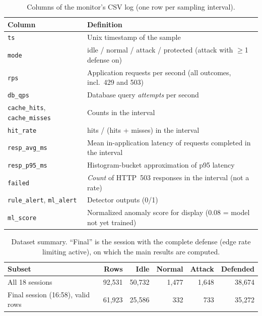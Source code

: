 \documentclass[preprint,12pt]{elsarticle}
\begin{document}
\begin{table}[t]
\centering
\caption{Columns of the monitor's CSV log (one row per sampling interval).}
\label{tab:csv}
\small
\begin{tabularx}{\linewidth}{@{}L{2.6cm}Y@{}}
\toprule
Column & Definition \\
\midrule
\texttt{ts} & Unix timestamp of the sample \\
\texttt{mode} & idle / normal / attack / protected (attack with $\ge$1 defense on) \\
\texttt{rps} & Application requests per second (all outcomes, incl.\ 429 and 503) \\
\texttt{db\_qps} & Database query \emph{attempts} per second \\
\texttt{cache\_hits}, \texttt{cache\_misses} & Counts in the interval \\
\texttt{hit\_rate} & hits / (hits + misses) in the interval \\
\texttt{resp\_avg\_ms} & Mean in-application latency of requests completed in the interval \\
\texttt{resp\_p95\_ms} & Histogram-bucket approximation of p95 latency \\
\texttt{failed} & \emph{Count} of HTTP~503 responses in the interval (not a rate) \\
\texttt{rule\_alert}, \texttt{ml\_alert} & Detector outputs (0/1) \\
\texttt{ml\_score} & Normalized anomaly score for display (0.08 = model not yet trained) \\
\bottomrule
\end{tabularx}
\end{table}

\begin{table}[t]
\centering
\caption{Dataset summary. ``Final'' is the session with the complete defense
(edge rate limiting active), on which the main results are computed.}
\label{tab:dataset}
\small
\begin{tabular}{@{}lrrrrr@{}}
\toprule
Subset & Rows & Idle & Normal & Attack & Defended \\
\midrule
All 18 sessions & 92{,}531 & 50{,}732 & 1{,}477 & 1{,}648 & 38{,}674 \\
Final session (16:58), valid rows & 61{,}923 & 25{,}586 & 332 & 733 & 35{,}272 \\
\bottomrule
\end{tabular}
\end{table}
\end{document}
